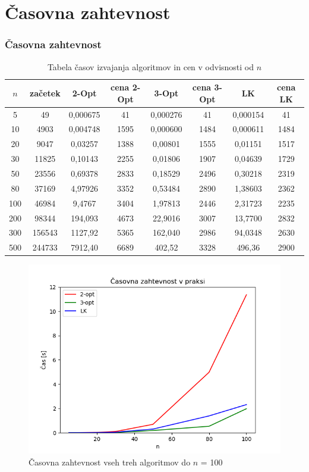 \documentclass[8pt]{beamer}
\begin{document}
\section[Časovna zahtevnost]{Časovna zahtevnost}
\begin{frame}
\frametitle{Časovna zahtevnost}
\begin{table}[!h]
\begin{tabular}{|c|c|c|c|c|c|c|c|}
\hline
$n$&začetek&2-Opt&cena 2-Opt&3-Opt&cena 3-Opt&LK&cena LK\\\hline
5&49&0,000675&41&0,000276&41&0,000154&41\\\hline
10&4903&0,004748&1595&0,000600&1484&0,000611&1484\\\hline
20&9047&0,03257&1388&0,00801&1555&0,01151&1517\\\hline
30&11825&0,10143&2255&0,01806&1907&0,04639&1729\\\hline
50&23556&0,69378&2833&0,18529&2496&0,30218&2319\\\hline
80&37169&4,97926&3352&0,53484&2890&1,38603&2362\\\hline
100&46984&9,4767&3404&1,97813&2446&2,31723&2235\\\hline
200&98344&194,093&4673&22,9016&3007&13,7700&2832\\\hline
300&156543&1127,92&5365&162,040&2986&94,0348&2630\\\hline
500&244733&7912,40&6689&402,52&3328&496,36&2900\\\hline
\end{tabular}
\caption{Tabela časov izvajanja algoritmov in cen v odvisnosti od $n$}
\label{tabela_casov}
\end{table}
\end{frame}

\begin{frame}
\begin{figure}[!h]
 \begin{center}
  \includegraphics[width=12 cm]{casovna_zahtevnost_do_100.png}
  \caption{Časovna zahtevnost vseh treh algoritmov do $n$ = 100}
  \label{casovna_do_100}
\end{center}
\end{figure}
\end{frame}
\end{document}
